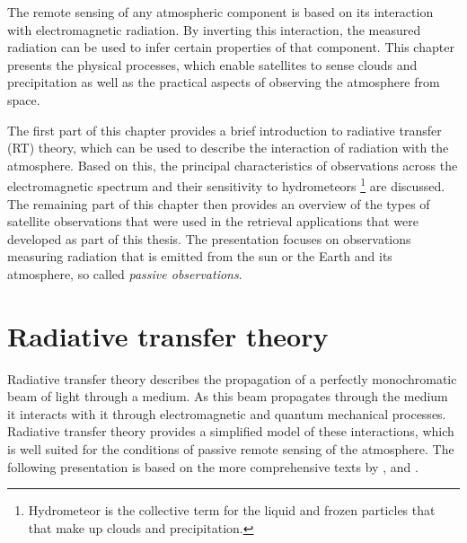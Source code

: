 
The remote sensing of any atmospheric component is based on its interaction with
electromagnetic radiation. By inverting this interaction, the measured radiation
can be used to infer certain properties of that component. This chapter presents
the physical processes, which enable satellites to sense clouds and
precipitation as well as the practical aspects of observing the
atmosphere from space.


The first part of this chapter provides a brief introduction to
radiative transfer (RT) theory, which can be used to describe  the
interaction of radiation with the atmosphere. Based on this, the
principal characteristics of observations across the electromagnetic
spectrum and their sensitivity to hydrometeors%
\footnote{%
Hydrometeor is the collective term for the liquid and frozen particles that
that make up clouds and precipitation.
}%
 are discussed. The remaining part of this chapter then provides an overview of
 the types of satellite observations that were used in the retrieval
 applications that were developed as part of this thesis.
The presentation focuses on observations measuring radiation that is
emitted from the sun or the Earth and its atmosphere, so called
\textit{passive observations}.




\section{Radiative transfer theory}

Radiative transfer theory describes the propagation of a perfectly monochromatic
beam of light through a medium. As this beam propagates through the medium it
interacts with it through electromagnetic and quantum mechanical processes.
Radiative transfer theory provides a simplified model of these interactions,
which is well suited for the conditions of passive remote sensing of the
atmosphere.  The following presentation is  based on the more
comprehensive texts by \citet{mishenko02}, \citet{thomas02} and \citet{wallace06}.

